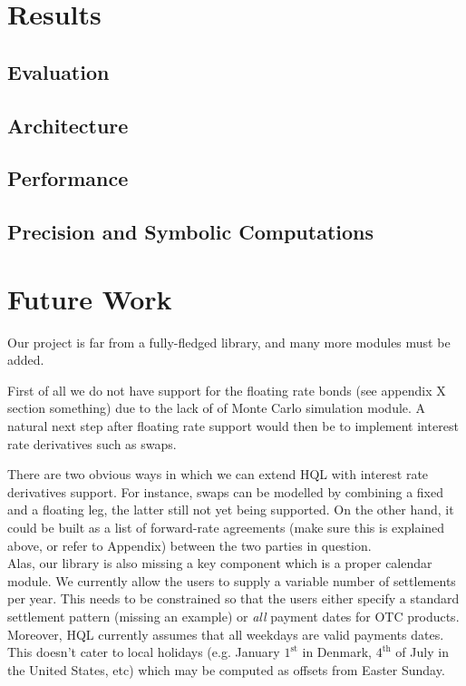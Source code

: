 \chapter{Results}

\section{Evaluation}

\section{Architecture}

\section{Performance}

\section{Precision and Symbolic Computations}

\chapter{Future Work}\label{chap:fw}

Our project is far from a fully-fledged library, and many more modules must be added.

First of all we do not have support for the floating rate bonds
(see appendix X section something) due to the lack of of Monte Carlo
simulation module. A natural next step after floating rate support
would then be to implement interest rate derivatives such as swaps.

There are two obvious ways in which we can extend HQL with interest rate
derivatives support. For instance, swaps can be modelled by combining a
fixed and a floating leg, the latter still not yet being supported. On the
other hand, it could be built as a list of forward-rate agreements (make sure
this is explained above, or refer to Appendix) between the two parties in
question.\\

Alas, our library is also missing a key component which is a proper calendar
module. We currently allow the users to supply a variable number of
settlements per year. This needs to be constrained so that the users either
specify a standard settlement pattern (missing an example) or \emph{all}
payment dates for OTC products. Moreover, HQL currently assumes that all
weekdays are valid payments dates. This doesn't cater to local holidays
(e.g. January $1^{\text{st}}$ in Denmark, $4^{\text{th}}$ of July in the
United States, etc) which may be computed as offsets from Easter Sunday.\\

